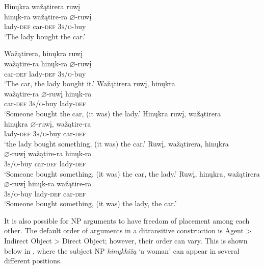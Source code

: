 \documentclass[output=paper]{LSP/langsci}
\begin{document}
\begin{exe}
\ex 
\glll Hin\k{u}kra wa\v{z}ątirera ruw\k{i}  \\
hin\k{u}k-ra	wa\v{z}ątire-ra 	$\varnothing$-ruw\k{i} \\
lady-\textsc{def}	car-\textsc{def}	 \textsc{3s/o}-buy \\
\trans `The lady bought the car.'
\ex
\begin{xlist}
\ex	
\glll Wa\v{z}ątirera,	hin\k{u}kra		ruw\k{i} \\
wa\v{z}ątire-ra 	hin\k{u}k-ra		$\varnothing$-ruw\k{i} \\
car-\textsc{def}			lady-\textsc{def}		\textsc{3s/o}-buy \\
\trans `The car, the lady bought it.'
\ex  
\glll Wa\v{z}ątirera		ruw\k{i},			hin\k{u}kra\\
wa\v{z}ątire-ra	$\varnothing$-ruw\k{i}	hin\k{u}k-ra \\
car-\textsc{def} 			\textsc{3s/o}-buy 	lady-\textsc{def} \\
\trans `Someone bought the car, (it was) the lady.'
\ex 
\glll Hin\k{u}kra 		ruw\k{i}, 		wa\v{z}ątirera \\
hin\k{u}kra 	$\varnothing$-ruw\k{i}, 		wa\v{z}ątire-ra \\
lady-\textsc{def} \textsc{3s/o}-buy car-\textsc{def} \\
\trans `the lady bought something, (it was) the car.'
\ex 
\glll Ruw\k{i}, 		wa\v{z}ątirera,	hin\k{u}kra\\
$\varnothing$-ruw\k{i}	wa\v{z}ątire-ra	hin\k{u}k-ra \\
\textsc{3s/o}-buy car-\textsc{def} lady-\textsc{def} \\
\trans `Someone bought something, (it was) the car, the lady.'
\ex 
\glll Ruw\k{i}, 		hin\k{u}kra, 	wa\v{z}ątirera \\
$\varnothing$-ruw\k{i} 	hin\k{u}k-ra 	wa\v{z}ątire-ra \\ 
\textsc{3s/o}-buy lady-\textsc{def} car-\textsc{def} \\
\trans `Someone bought something, (it was) the lady, the car.'
\end{xlist}
\end{exe}

It is also possible for NP arguments to have freedom of placement among each other. The default order of arguments in a ditransitive construction is Agent > Indirect Object > Direct Object; however, their order can vary.  This is shown below in , where the subject NP \textit{hin\k{u}khi\v{z}ą} `a woman' can appear in several different positions.
\end{document}
